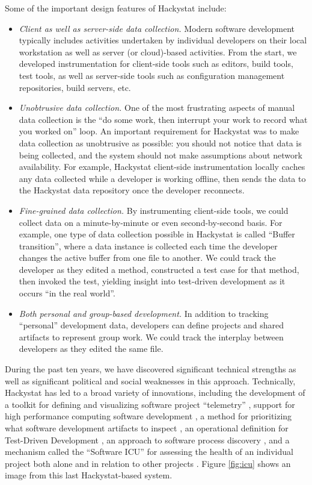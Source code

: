 \documentclass[]{article}
\begin{document}
Some of the important design features of Hackystat include:
\begin{itemize}
\item {\em Client as well as server-side data collection.}  Modern software development
  typically includes activities undertaken by individual developers on their local
  workstation as well as server (or cloud)-based activities. From the start, we developed
  instrumentation for client-side tools such as editors, build tools, test tools, as well
  as server-side tools such as configuration management repositories, build servers, etc.
\item {\em Unobtrusive data collection.}  One of the most frustrating aspects of manual data
  collection is the ``do some work, then interrupt your work to record what you worked on''
  loop. An important requirement for Hackystat was to make data collection as unobtrusive
  as possible: you should not notice that data is being collected, and the system should
  not make assumptions about network availability. For example, Hackystat client-side
  instrumentation locally caches any data collected while a developer is working
  offline, then sends the data to the Hackystat data repository once the developer
  reconnects. 
\item {\em Fine-grained data collection.}  By instrumenting client-side tools, we could
  collect data on a minute-by-minute or even second-by-second basis. For example, one type
  of data collection possible in Hackystat is called ``Buffer transition'', where a data
  instance is collected each time the developer changes the active buffer from one file to
  another.  We could track the developer as they edited a method, constructed a test case
  for that method, then invoked the test, yielding insight into test-driven development as
  it occurs ``in the real world''.
\item {\em Both personal and group-based development.}  In addition to tracking ``personal''
  development data, developers can define projects and shared artifacts to represent group
  work.  We could track the interplay between developers as they edited the same file. 
\end{itemize}

During the past ten years, we have discovered significant technical strengths as well as
significant political and social weaknesses in this approach.  Technically, Hackystat has
led to a broad variety of innovations, including the development of a toolkit for defining
and visualizing software project ``telemetry'' \cite{csdl2-04-11}, support for high
performance computing software development \cite{csdl2-04-22}, a method for prioritizing
what software development artifacts to inspect \cite{csdl2-05-01}, an operational
definition for Test-Driven Development \cite{csdl2-09-01}, an approach to software process
discovery \cite{csdl2-10-09}, and a mechanism called the ``Software ICU'' for assessing
the health of an individual project both alone and in relation to other projects
\cite{csdl2-09-02}.  Figure \ref{fig:icu} shows an image from this last Hackystat-based system.
\end{document}

